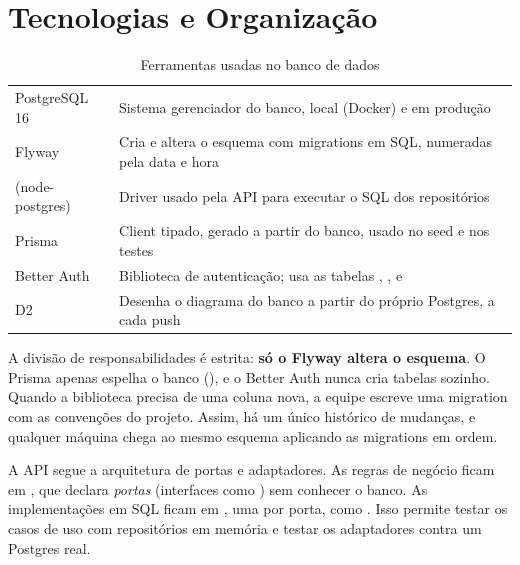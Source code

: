 \section{Tecnologias e Organização}
\label{sec:tecnologias}

\begin{table}[htbp]
  \centering
  \caption{Ferramentas usadas no banco de dados}
  \label{tab:ferramentas}
  \begin{tabularx}{\textwidth}{@{}L{0.6}L{1.4}@{}}
    \toprule
     &  \\
    \midrule
    PostgreSQL 16 & Sistema gerenciador do banco, local (Docker) e em produção \\
    Flyway & Cria e altera o esquema com migrations em SQL, numeradas pela data e hora \\
     (node-postgres) & Driver usado pela API para executar o SQL dos repositórios \\
    Prisma & Client tipado, gerado a partir do banco, usado no seed e nos testes \\
    Better Auth & Biblioteca de autenticação; usa as tabelas , ,  e  \\
    D2 & Desenha o diagrama do banco a partir do próprio Postgres, a cada push \\
    \bottomrule
  \end{tabularx}
\end{table}

A divisão de responsabilidades é estrita: \textbf{só o Flyway altera o
esquema}. O Prisma apenas espelha o banco (), e o Better
Auth nunca cria tabelas sozinho. Quando a biblioteca precisa de uma coluna
nova, a equipe escreve uma migration com as convenções do projeto. Assim, há
um único histórico de mudanças, e qualquer máquina chega ao mesmo esquema
aplicando as migrations em ordem.

A API segue a arquitetura de portas e adaptadores. As regras de negócio ficam
em , que declara \emph{portas} (interfaces como
) sem conhecer o banco. As implementações em SQL
ficam em , uma por porta, como
. Isso permite testar os casos de uso com
repositórios em memória e testar os adaptadores contra um Postgres real.
